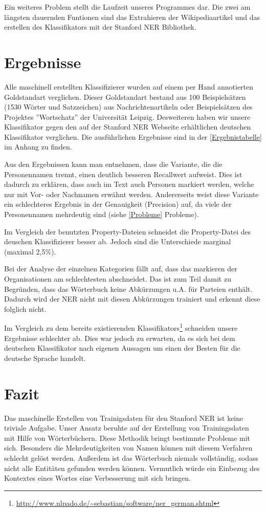 \documentclass[a4paper]{article}
\begin{document}
	Ein weiteres Problem stellt die Laufzeit unseres Programmes dar. 
	Die zwei am längsten dauernden Funtionen sind das Extrahieren der Wikipediaartikel und das erstellen des Klassifikators mit der Stanford NER Bibliothek.
\section{Ergebnisse}
	Alle maschinell erstellten Klassifizierer wurden auf einem per Hand annotierten Goldstandart verglichen. 
	Dieser Goldstandart bestand aus 100 Beispielsätzen (1530 Wörter und Satzzeichen) aus Nachrichtenartikeln oder Beispielsätzen des Projektes ''Wortschatz'' der Universität Leipzig. 
	Desweiteren haben wir unsere Klassifikator gegen den auf der Stanford NER Webseite erhältlichen deutschen Klassifikator  verglichen. 
	Die ausführlichen Ergebnisse sind in der \autoref{Ergebnistabelle} im Anhang zu finden.
	
	Aus den Ergebnissen kann man entnehmen, dass die Variante, die die Personennamen trennt, einen deutlich besseren Recallwert aufweist. 
	Dies ist dadurch zu erklären, dass auch im Text auch Personen markiert werden, welche nur mit Vor- oder Nachnamen erwähnt werden. 
	Andererseits weist diese Variante ein schlechteres Ergebnis in der Genauigkeit (Precision) auf, da viele der Personennamen mehrdeutig sind (siehe \ref{Probleme} Probleme).
	
	Im Vergleich der benutzten Property-Dateien schneidet die Property-Datei des deuschen Klassifizierer besser ab. 
	Jedoch sind die Unterschiede marginal (maximal 2,5\%). 	
	
	Bei der Analyse der einzelnen Kategorien fällt auf, dass das markieren der Organisationen am schlechtesten abschneidet. 
	Das ist zum Teil damit zu Begründen, dass das Wörterbuch keine Abkürzungen u.A. für Parteien enthält. 
	Dadurch wird der NER nicht mit diesen Abkürzungen trainiert und erkennt diese folglich nicht. 
	
	Im Vergleich zu dem bereits existierenden Klassifikators\footnote{\url{http://www.nlpado.de/~sebastian/software/ner_german.shtml}} schneiden unsere Ergebnisse schlechter ab. 
	Dies war jedoch zu erwarten, da es sich bei dem deutschen Klassifikator nach eigenen Aussagen um einen der Besten für die deutsche Sprache handelt. 
	
\section{Fazit}	
	Das maschinelle Erstellen von Trainigsdaten für den Stanford NER ist keine triviale Aufgabe. 
	Unser Ansatz beruhte auf der Erstellung von Trainingsdaten mit Hilfe von Wörterbüchern. 
	Diese Methodik bringt bestimmte Probleme mit sich. 
	Besonders die Mehrdeutigkeiten von Namen können mit diesem Verfahren schlecht gelöst werden. 
	Außerdem ist das Wörterbuch niemals vollständig, sodass nicht alle Entitäten gefunden werden können. 
	Vermutlich würde ein Einbezug des Kontextes eines Wortes eine Verbesserung mit sich bringen. 
	
\end{document}
